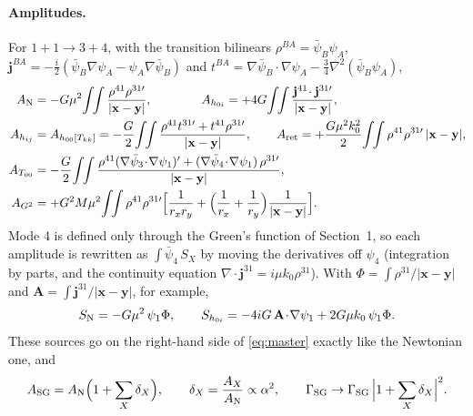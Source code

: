 \documentclass[11pt]{article}
\newcommand{\bx}{\mathbf{x}}\newcommand{\by}{\mathbf{y}}
\begin{document}
\paragraph{Amplitudes.} For $1+1\to3+4$, with the transition bilinears $\rho^{BA}=\bar\psi_B\psi_A$,
$\mathbf j^{BA}=-\tfrac{i}{2}(\bar\psi_B\nabla\psi_A-\psi_A\nabla\bar\psi_B)$ and
$t^{BA}=\nabla\bar\psi_B\!\cdot\!\nabla\psi_A-\tfrac34\nabla^2(\bar\psi_B\psi_A)$,
\begin{align}
A_{\rm N}&=-G\mu^2\!\int\!\!\int\frac{\rho^{41}\rho^{31\prime}}{|\bx-\by|}, \qquad\qquad
A_{h_{0i}}=+4G\!\int\!\!\int\frac{\mathbf j^{41}\!\cdot\mathbf j^{31\prime}}{|\bx-\by|},\nonumber\\
A_{h_{ij}}&=A_{h_{00}[T_{kk}]}=-\frac G2\!\int\!\!\int\frac{\rho^{41}t^{31\prime}+t^{41}\rho^{31\prime}}{|\bx-\by|}, \qquad
A_{\rm ret}=+\frac{G\mu^2k_0^2}{2}\!\int\!\!\int\rho^{41}\rho^{31\prime}\,|\bx-\by|,\nonumber\\
A_{T_{00}}&=-\frac G2\!\int\!\!\int\frac{\rho^{41}(\nabla\bar\psi_3\!\cdot\!\nabla\psi_1)'+(\nabla\bar\psi_4\!\cdot\!\nabla\psi_1)\,\rho^{31\prime}}{|\bx-\by|},\\
A_{G^2}&=+G^2M\mu^2\!\int\!\!\int\rho^{41}\rho^{31\prime}\Big[\frac1{r_xr_y}+\Big(\frac1{r_x}+\frac1{r_y}\Big)\frac1{|\bx-\by|}\Big].\nonumber
\end{align}
Mode 4 is defined only through the Green's function of Section~1, so each amplitude is rewritten as $\int\!\bar\psi_4\,S_X$ by moving the
derivatives off $\psi_4$ (integration by parts, and the continuity equation $\nabla\!\cdot\mathbf j^{31}=i\mu k_0\rho^{31}$). With
$\Phi=\int\!\rho^{31}/|\bx-\by|$ and $\mathbf A=\int\!\mathbf j^{31}/|\bx-\by|$, for example,
\begin{equation}
S_{\rm N}=-G\mu^2\,\psi_1\Phi,\qquad
S_{h_{0i}}=-4iG\,\mathbf A\!\cdot\!\nabla\psi_1+2G\mu k_0\,\psi_1\Phi .
\end{equation}
These sources go on the right-hand side of \eqref{eq:master} exactly like the Newtonian one, and
\begin{equation}
A_{\rm SG}=A_{\rm N}\Big(1+\sum_X\delta_X\Big),\qquad\delta_X=\frac{A_X}{A_{\rm N}}\propto\alpha^2,\qquad
\Gamma_{\rm SG}\to\Gamma_{\rm SG}\,\Big|1+\sum_X\delta_X\Big|^2 .
\end{equation}
\end{document}
